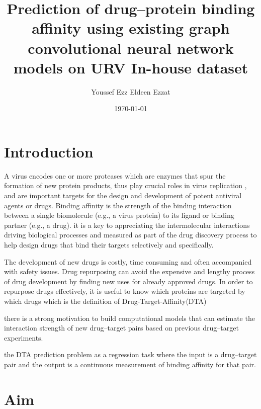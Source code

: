 \documentclass[11pt, a4paper]{article}
\title{Prediction of drug–protein binding affinity using existing graph convolutional neural network models on URV In-house dataset}
\author{Youssef Ezz Eldeen Ezzat}
\date{\today}
\begin{document}


\tableofcontents

\section{Introduction}


A virus encodes one or more proteases which are enzymes that spur the formation of new protein products, thus play crucial roles in virus replication ,
and are important targets for the design and development of potent antiviral agents or drugs.
Binding affinity is the strength of the binding interaction between a single biomolecule (e.g., a virus protein) to its ligand or binding partner (e.g., a drug).
it is a key to appreciating the intermolecular interactions driving biological processes and measured as part of the drug discovery process to help design drugs that bind their targets selectively and specifically.

The development of new drugs is costly, time consuming and often accompanied with safety issues.
Drug repurposing can avoid the expensive and lengthy process of drug development by finding new uses for already approved drugs. In order to repurpose drugs effectively, it is useful to know which proteins are targeted by
which drugs which is the definition of Drug-Target-Affinity(DTA)\cite{1}

there is a strong motivation to build computational models that can estimate the interaction strength of new drug–target pairs based on previous drug–target
experiments.

the DTA prediction problem as a regression task where the input is a drug–target pair and the output is a continuous measurement of binding affinity
for that pair.

\section{Aim}
\end{document}
